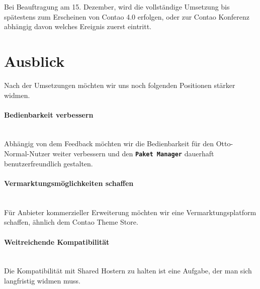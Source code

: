 \documentclass[
paper=a4,
draft=false,%
fontsize=10pt%
]{scrartcl}
\newcommand{\packageManager}{\textbf{\texttt{Paket Manager}}}
\begin{document}
Bei Beauftragung am 15. Dezember, wird die vollständige Umsetzung bis spätestens zum Erscheinen von Contao 4.0 erfolgen, oder zur Contao Konferenz abhängig davon welches Ereignis zuerst eintritt.

\newpage

%
%

\section{Ausblick}
\label{sec:forecast}

Nach der Umsetzungen möchten wir uns noch folgenden Positionen stärker widmen.

\paragraph{Bedienbarkeit verbessern} ~\\
Abhängig von dem Feedback möchten wir die Bedienbarkeit für den Otto-Normal-Nutzer weiter verbessern und den \packageManager{} dauerhaft benutzerfreundlich gestalten.

\paragraph{Vermarktungsmöglichkeiten schaffen} ~\\
Für Anbieter kommerzieller Erweiterung möchten wir eine Vermarktungsplatform schaffen, ähnlich dem Contao Theme Store.

\paragraph{Weitreichende Kompatibilität} ~\\
Die Kompatibilität mit  Shared Hostern zu halten ist eine Aufgabe, der man sich langfristig widmen muss.
\end{document}

